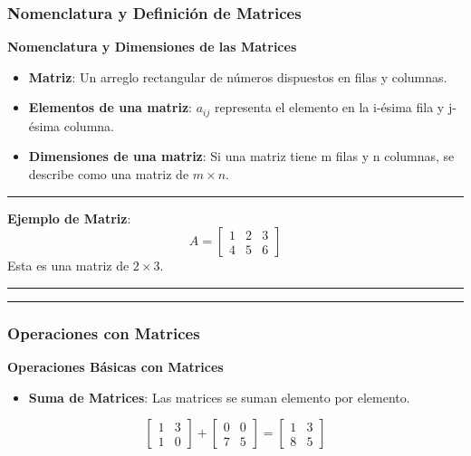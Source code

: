 \documentclass[
  letterpaper,
  DIV=11,
  numbers=noendperiod]{scrartcl}
\providecommand{\tightlist}{%
  \setlength{\itemsep}{0pt}\setlength{\parskip}{0pt}}\usepackage{longtable,booktabs,array}
\begin{document}
\subsubsection{Nomenclatura y Definición de
Matrices}\label{nomenclatura-y-definiciuxf3n-de-matrices}

\textbf{Nomenclatura y Dimensiones de las Matrices}

\begin{itemize}
\tightlist
\item
  \textbf{Matriz}: Un arreglo rectangular de números dispuestos en filas
  y columnas.
\item
  \textbf{Elementos de una matriz}: \(a_{ij}\) representa el elemento en
  la i-ésima fila y j-ésima columna.
\item
  \textbf{Dimensiones de una matriz}: Si una matriz tiene m filas y n
  columnas, se describe como una matriz de \(m \times n\).
\end{itemize}

\begin{center}\rule{0.5\linewidth}{0.5pt}\end{center}

\textbf{Ejemplo de Matriz}: \[ A = \begin{bmatrix}
1 & 2 & 3 \\
4 & 5 & 6
\end{bmatrix} \] Esta es una matriz de \(2    \times 3\).

\begin{center}\rule{0.5\linewidth}{0.5pt}\end{center}

\begin{center}\rule{0.5\linewidth}{0.5pt}\end{center}

\subsubsection{Operaciones con Matrices}\label{operaciones-con-matrices}

\textbf{Operaciones Básicas con Matrices}

\begin{itemize}
\tightlist
\item
  \textbf{Suma de Matrices}: Las matrices se suman elemento por
  elemento.
\end{itemize}

\[\begin{bmatrix} 1 & 3 \\ 1 & 0 \end{bmatrix} + \begin{bmatrix} 0 & 0 \\ 7 & 5 \end{bmatrix} = \begin{bmatrix} 1 & 3 \\ 8 & 5 \end{bmatrix}\]
\end{document}
